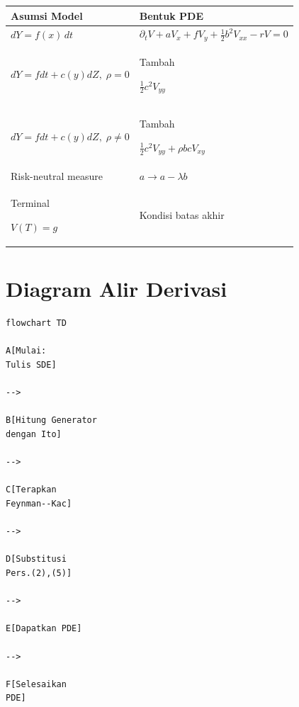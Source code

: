 \documentclass[12pt,a4paper]{article}
\begin{document}
\begin{table}[h]
\centering
\renewcommand{\arraystretch}{1.4}

\begin{tabular}{p{5cm}p{8cm}}

\toprule

\textbf{Asumsi Model}
&
\textbf{Bentuk PDE}

\\
\midrule

$
dY=f(x)\,dt
$

&

$
\partial_tV+aV_x+fV_y+\frac12b^2V_{xx}-rV=0
$

\\

$
dY=fdt+c(y)dZ,\;
\rho=0
$

&

Tambah

$
\frac12c^2V_{yy}
$

\\

$
dY=fdt+c(y)dZ,\;
\rho\neq0
$

&

Tambah

$
\frac12c^2V_{yy}
+
\rho bcV_{xy}
$

\\

Risk-neutral measure

&

$
a\to a-\lambda b
$

\\

Terminal

$
V(T)=g
$

&

Kondisi batas akhir

\\

\bottomrule

\end{tabular}

\end{table}

\section{Diagram Alir Derivasi}

\begin{verbatim}
flowchart TD

A[Mulai:
Tulis SDE]

-->

B[Hitung Generator
dengan Ito]

-->

C[Terapkan
Feynman--Kac]

-->

D[Substitusi
Pers.(2),(5)]

-->

E[Dapatkan PDE]

-->

F[Selesaikan
PDE]
\end{verbatim}
\end{document}
